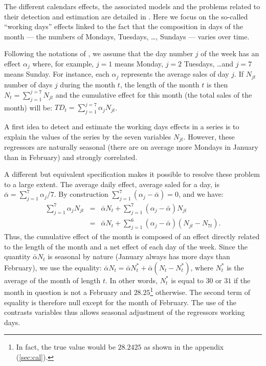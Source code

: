 \documentclass[12pt, a4paper]{article}
\begin{document}
The different calendars effects, the associated models and the problems related to their detection and estimation are detailed in \cite{L2018}. Here we focus on the so-called ``working days'' effects linked to the fact that the composition in days of the month --- the numbers of Mondays, Tuesdays, \dots, Sundays --- varies over time.

Following the notations of \cite{FMBOC1998}, we assume that the day number $j$ of the week has an effect $\alpha_j$ where, for example, $j=1$ means Monday, $j=2$  Tuesdays, \dots and $j=7$ means Sunday. For instance, each $\alpha_j$ represents the average sales of day $j$. If $N_{jt}$ number of days $j$ during the month $t$, the length of the month $t$ is then $N_t = \sum_{j=1}^{j=7} N_{jt}$ and the cumulative effect for this month (the total sales of the month) will be:
$TD_t = \sum_{j=1}^{j=7} \alpha_j N_{jt}$.

A first idea to detect and estimate the working days effects in a series is to explain the values of the series by the seven variables $N_{jt} $. However, these regressors are naturally seasonal (there are on average more Mondays in January than in February) and strongly correlated.

A different but equivalent specification makes it possible to resolve these problem to a large extent. The average daily effect, average saled for a day, is $\bar{\alpha} = \sum_{j=1}^7 \alpha_j /7$. 
By construction $\sum_{j=1}^7 \left(\alpha_j-\bar{\alpha}\right) = 0$, and we have:
\begin{eqnarray*}
\sum_{j=1}^7 \alpha_j N_{jt} & = & \bar{\alpha}N_t + \sum_{j=1}^7 \left(\alpha_j-\bar{\alpha}\right) N_{jt} \nonumber \\
& = &  \bar{\alpha}N_t + \sum_{j=1}^6 \left(\alpha_j-\bar{\alpha}\right) \left(N_{jt} - N_{7t}\right).
\end{eqnarray*}
Thus, the cumulative effect of the month is composed of an effect directly related to the length of the month and a net effect of each day of the week. Since the quantity $ \bar{\alpha} N_t $ is seasonal by nature (January always has more days than February), we use the equality: $\bar{\alpha}N_t = \bar{\alpha}N_t^* + \bar{\alpha}\left(N_t-N_t^*\right)$, where $N_t^*$
is the average of the month of length $t$. In other words, $N_t^*$ is equal to $30$ or $31$ if the month in question is not a February and $28.25$\footnote {In fact, the true value would be $28.2425 $ as shown in the appendix (\ref{sec:cal}).} otherwise. The second term of equality is therefore null except for the month of February. The use of the contrasts variables thus allows seasonal adjustment of the regressors working days.
\end{document}
